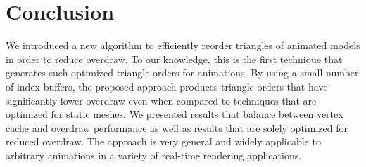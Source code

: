 \section{Conclusion}

We introduced a new algorithm to efficiently reorder triangles
of animated models in order to reduce overdraw. To our knowledge,
this is the first technique that generates such optimized triangle orders for
animations. By using a small number of index buffers, the proposed 
approach produces triangle orders that have significantly
 lower overdraw even when compared 
to techniques that are optimized for static meshes. We presented results
that balance between vertex cache and overdraw performance
as well as results that are solely optimized for reduced overdraw. The approach
is very general and widely applicable to arbitrary animations
in a variety of real-time rendering applications.

